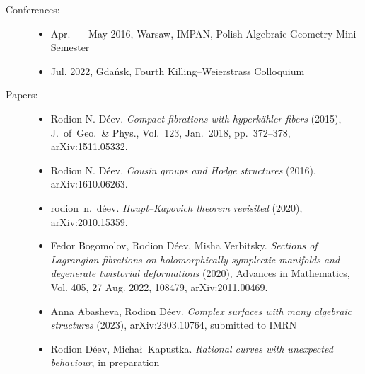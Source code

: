 \documentclass{article}
\begin{document}
\begin{description}

\item[Conferences:] \begin{itemize}
\item Apr.~--- May 2016,  Warsaw,  IMPAN,  Polish Algebraic Geometry Mini-Semester
\item Jul.  2022,  Gda\'nsk,  Fourth Killing--Weierstrass Colloquium
\end{itemize}


\item[Papers:] \begin{itemize}
     \item Rodion N. D\'eev. {\em 
     Compact fibrations with hyperk\"ahler fibers} (2015), J.~of~Geo.~\& Phys., 
     Vol.~123, Jan.~2018, pp.~372--378, arXiv:1511.05332.
     \item Rodion N. D\'eev. {\em
     Cousin groups and Hodge structures} (2016), arXiv:1610.06263.
     \item rodion~n.~d\'eev. {\em Haupt--Kapovich theorem revisited} (2020),
     arXiv:2010.15359.
     \item Fedor Bogomolov, Rodion D\'eev, Misha Verbitsky. {\em 
     Sections of Lagrangian fibrations on holomorphically symplectic manifolds 
     and degenerate twistorial deformations} (2020),  Advances in Mathematics, 
     Vol.  405,  27 Aug.  2022,  108479,  arXiv:2011.00469.
     \item Anna Abasheva,  Rodion D\'eev.  {\em Complex surfaces with many 
     algebraic  structures} (2023),  arXiv:2303.10764,  submitted to IMRN
     \item Rodion D\'eev,  Micha\l~Kapustka.  {\em Rational curves with unexpected
     behaviour},  in preparation
\end{itemize}


\end{description}
\end{document}
